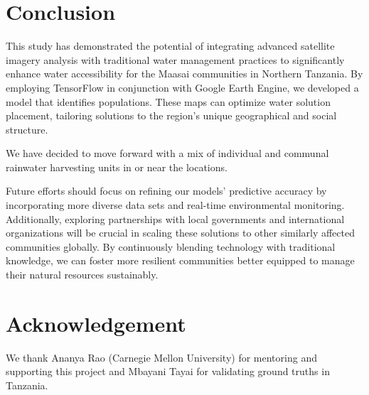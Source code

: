 \documentclass[10pt]{article}
\begin{document}

\section{Conclusion}

This study has demonstrated the potential of integrating advanced satellite imagery analysis with traditional water management practices to significantly enhance water accessibility for the Maasai communities in Northern Tanzania. By employing TensorFlow in conjunction with Google Earth Engine, we developed a model that identifies populations. These maps can optimize water solution placement, tailoring solutions to the region's unique geographical and social structure.

We have decided to move forward with a mix of individual and communal rainwater harvesting units in or near the locations.

Future efforts should focus on refining our models' predictive accuracy by incorporating more diverse data sets and real-time environmental monitoring. Additionally, exploring partnerships with local governments and international organizations will be crucial in scaling these solutions to other similarly affected communities globally. By continuously blending technology with traditional knowledge, we can foster more resilient communities better equipped to manage their natural resources sustainably.

\section*{Acknowledgement}

We thank Ananya Rao (Carnegie Mellon University) for mentoring and supporting this project and Mbayani Tayai for validating ground truths in Tanzania.

\printbibliography
\end{document}
